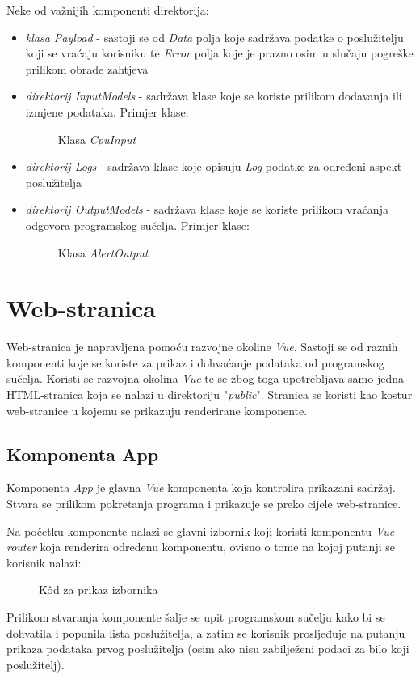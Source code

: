 \documentclass[zavrsnirad]{fer}
\begin{document}
Neke od važnijih komponenti direktorija:
\begin{itemize}
	\item \textit{klasa Payload} - sastoji se od \textit{Data} polja koje sadržava podatke o poslužitelju koji se vraćaju korisniku te \textit{Error} polja koje je prazno osim u slučaju pogreške prilikom obrade zahtjeva
	\item \textit{direktorij InputModels}  - sadržava klase koje se koriste prilikom dodavanja ili izmjene podataka. Primjer klase:
	\begin{figure}[htb]
		\centering
		
		\caption{Klasa \textit{CpuInput}}
	\end{figure}
	\FloatBarrier
	\item \textit{direktorij Logs} - sadržava klase koje opisuju \textit{Log} podatke za određeni aspekt poslužitelja
	\item \textit{direktorij OutputModels} - sadržava klase koje se koriste prilikom vraćanja odgovora programskog sučelja. Primjer klase:
	\begin{figure}[htb]
		\centering
		
		\caption{Klasa \textit{AlertOutput}}
	\end{figure}
	\FloatBarrier
\end{itemize}

\section{Web-stranica}
Web-stranica je napravljena pomoću razvojne okoline \textit{Vue}. Sastoji se od raznih komponenti koje se koriste za prikaz i dohvaćanje podataka od programskog sučelja.
Koristi se razvojna okolina \textit{Vue} te se zbog toga upotrebljava samo jedna HTML-stranica koja se nalazi u direktoriju "\textit{public}". Stranica se koristi kao kostur web-stranice u kojemu se prikazuju renderirane komponente.

\subsection{Komponenta App}
Komponenta \textit{App} je glavna \textit{Vue} komponenta koja kontrolira prikazani sadržaj. Stvara se prilikom pokretanja programa i prikazuje se preko cijele web-stranice.

Na početku komponente nalazi se glavni izbornik koji koristi komponentu \textit{Vue router} koja renderira određenu komponentu, ovisno o tome na kojoj putanji se korisnik nalazi:
\begin{figure}[htb]
	\centering
	
	\caption{Kôd za prikaz izbornika \cite{primevue_menubar_component}}
\end{figure}
\FloatBarrier
Prilikom stvaranja komponente šalje se upit programskom sučelju kako bi se dohvatila i popunila lista poslužitelja, a zatim se korisnik prosljeđuje na putanju prikaza podataka prvog poslužitelja (osim ako nisu zabilježeni podaci za bilo koji poslužitelj).
\end{document}
